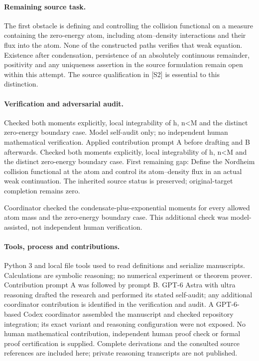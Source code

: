 \documentclass[11pt]{article}
\begin{document}
\paragraph{Remaining source task.} The first obstacle is defining and controlling the collision functional on a measure containing the zero-energy atom, including atom--density interactions and their flux into the atom. None of the constructed paths verifies that weak equation. Existence after condensation, persistence of an absolutely continuous remainder, positivity and any uniqueness assertion in the source formulation remain open within this attempt. The source qualification in [S2] is essential to this distinction.

\paragraph{Verification and adversarial audit.}
Checked both moments explicitly, local integrability of h, n<M and the distinct zero-energy boundary case. Model self-audit only; no independent human mathematical verification. Applied contribution prompt A before drafting and B afterwards. Checked both moments explicitly, local integrability of h, n<M and the distinct zero-energy boundary case. First remaining gap: Define the Nordheim collision functional at the atom and control its atom--density flux in an actual weak continuation. The inherited source status is preserved; original-target completion remains zero.

Coordinator checked the condensate-plus-exponential moments for every allowed atom mass and the zero-energy boundary case. This additional check was model-assisted, not independent human verification.

\paragraph{Tools, process and contributions.}
Python 3 and local file tools used to read definitions and serialize manuscripts. Calculations are symbolic reasoning; no numerical experiment or theorem prover. Contribution prompt A was followed by prompt B. GPT-6 Astra with ultra reasoning drafted the research and performed its stated self-audit; any additional coordinator contribution is identified in the verification and audit. A GPT-6-based Codex coordinator assembled the manuscript and checked repository integration; its exact variant and reasoning configuration were not exposed. No human mathematical contribution, independent human proof check or formal proof certification is supplied. Complete derivations and the consulted source references are included here; private reasoning transcripts are not published.
\end{document}
